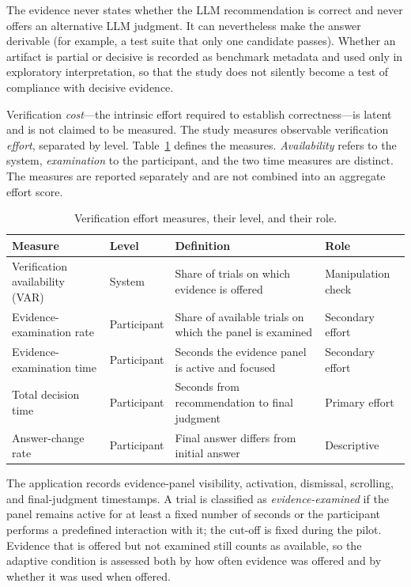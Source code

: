 \documentclass[oneside,final,14pt,a4paper]{extreport}
\begin{document}
The evidence never states whether the LLM recommendation is correct and never
offers an alternative LLM judgment. It can nevertheless make the answer
derivable (for example, a test suite that only one candidate passes). Whether an
artifact is partial or decisive is recorded as benchmark metadata and used only
in exploratory interpretation, so that the study does not silently become a
test of compliance with decisive evidence.

Verification \emph{cost}---the intrinsic effort required to establish
correctness---is latent and is not claimed to be measured. The study measures
observable verification \emph{effort}, separated by level.
Table~\ref{tab:measures} defines the measures. \emph{Availability} refers to the
system, \emph{examination} to the participant, and the two time measures are
distinct. The measures are reported separately and are not combined into an
aggregate effort score.

\begin{table}[t]
\centering
\caption{Verification effort measures, their level, and their role.}
\label{tab:measures}
\small
\begin{tabular}{@{}>{\raggedright\arraybackslash}p{3.9cm}>{\raggedright\arraybackslash}p{1.9cm}>{\raggedright\arraybackslash}p{5.5cm}>{\raggedright\arraybackslash}p{2.7cm}@{}}
\toprule
Measure & Level & Definition & Role \\
\midrule
Verification availability (VAR) & System &
Share of trials on which evidence is offered & Manipulation check \\
Evidence-examination rate & Participant &
Share of available trials on which the panel is examined & Secondary effort \\
Evidence-examination time & Participant &
Seconds the evidence panel is active and focused & Secondary effort \\
Total decision time & Participant &
Seconds from recommendation to final judgment & Primary effort \\
Answer-change rate & Participant &
Final answer differs from initial answer & Descriptive \\
\bottomrule
\end{tabular}
\end{table}

The application records evidence-panel visibility, activation, dismissal,
scrolling, and final-judgment timestamps. A trial is classified as
\emph{evidence-examined} if the panel remains active for at least a fixed number
of seconds or the participant performs a predefined interaction with it; the
cut-off is fixed during the pilot. Evidence that is offered but not examined
still counts as available, so the adaptive condition is assessed both by how
often evidence was offered and by whether it was used when offered.
\end{document}
